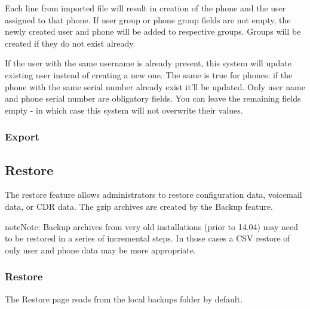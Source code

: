 \documentclass[letterpaper,10pt,english]{sphinxmanual}
\begin{document}
Each line from imported file will result in creation of the phone and the user assigned to that phone. If user group or phone group fields are not empty, the newly created user and phone will be added to respective groups. Groups will be created if they do not exist already.

If the user with the same username is already present, this system will update existing user instead of creating a new one. The same is true for phones: if the phone with the same serial number already exist it’ll be updated.
Only user name and phone serial number are obligatory fields. You can leave the remaining fields empty - in which case this system will not overwrite their values.


\subsubsection{Export}
\label{\detokenize{webui:export}}\begin{quote}

\end{quote}


\subsection{Restore}
\label{\detokenize{webui:restore}}\label{\detokenize{webui:backup-restore}}
The restore feature allows administrators to restore configuration data, voicemail data, or CDR data. The gzip archives are created by the Backup feature.

\begin{sphinxadmonition}{note}{Note:}
Backup archives from very old installations (prior to 14.04) may need to be restored in a series of incremental steps. In those cases a CSV restore of only user and phone data may be more appropriate.
\end{sphinxadmonition}


\subsubsection{Restore}
\label{\detokenize{webui:id23}}
The Restore page reads from the local backups folder by default.
\begin{quote}

\end{quote}
\end{document}
